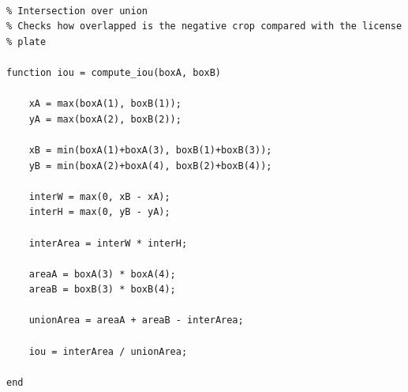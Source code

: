 \begin{verbatim}

% Intersection over union  
% Checks how overlapped is the negative crop compared with the license
% plate

function iou = compute_iou(boxA, boxB)

    xA = max(boxA(1), boxB(1));
    yA = max(boxA(2), boxB(2));
    
    xB = min(boxA(1)+boxA(3), boxB(1)+boxB(3));
    yB = min(boxA(2)+boxA(4), boxB(2)+boxB(4));
    
    interW = max(0, xB - xA);
    interH = max(0, yB - yA);
    
    interArea = interW * interH;
    
    areaA = boxA(3) * boxA(4);
    areaB = boxB(3) * boxB(4);
    
    unionArea = areaA + areaB - interArea;
    
    iou = interArea / unionArea;

end
    
\end{verbatim}

